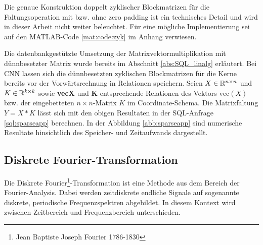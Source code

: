 Die genaue Konstruktion doppelt zyklischer Blockmatrizen für die Faltungsoperation mit bzw. ohne zero padding ist ein technisches Detail und wird in dieser Arbeit nicht weiter beleuchtet. Für eine mögliche Implementierung sei auf den MATLAB-Code \ref{mat:code:zyk} im Anhang verwiesen. 

Die datenbankgestützte Umsetzung der Matrixvektormultiplikation mit dünnbesetzter Matrix wurde bereits im Abschnitt \ref{abs:SQL_linalg} erläutert. Bei CNN lassen sich die dünnbesetzten zyklischen Blockmatrizen für die Kerne bereits vor der Vorwärtsrechnung in Relationen speichern. Seien $X \in \mathbb{R}^{n \times n}$ und $K \in \mathbb{R}^{k \times k}$ sowie \textbf{vecX} und \textbf{K} entsprechende Relationen des Vektors $\mathrm{vec}(X)$ bzw. der eingebetteten $n \times n$-Matrix $K$ im Coordinate-Schema. Die Matrixfaltung $Y = X \ast K$ lässt sich mit den obigen Resultaten in der SQL-Anfrage \ref{sql:sparseapp} berechnen. In der Abbildung \ref{abb:sparseapp} sind numerische Resultate hinsichtlich des Speicher- und Zeitaufwands dargestellt. 



\subsection{Diskrete Fourier-Transformation}
Die Diskrete Fourier\footnote{Jean Baptiste Joseph Fourier 1786-1830}-Transformation ist eine Methode aus dem Bereich der Fourier-Analysis. Dabei werden zeitdiskrete endliche Signale auf sogenannte diskrete, periodische Frequenzspektren abgebildet. In diesem Kontext wird zwischen Zeitbereich und Frequenzbereich unterschieden.

